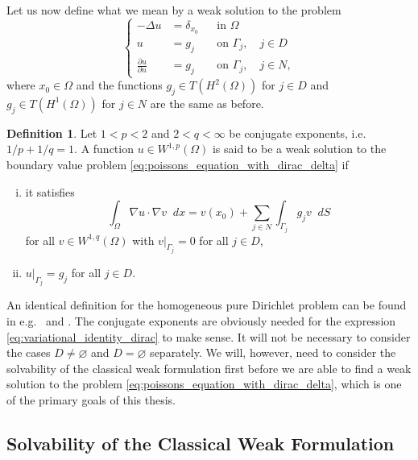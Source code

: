 \documentclass[english, 12pt, a4paper, sci, utf8, a-2b, online]{aaltothesis}
\theoremstyle{definition}
\newtheorem{definition}{Definition}[section]
\theoremstyle{plain}
\newcommand*\diff{\mathop{}\!d}
\numberwithin{equation}{section}
\begin{document}
Let us now define what we mean by a weak solution to the problem
\begin{equation}
    \label{eq:poissons_equation_with_dirac_delta}
    \left\{
        \begin{aligned}
            -\Delta u &= \delta_{x_0} && \text{in } \Omega \\
            u &= g_j && \text{on } \Gamma_j, \quad j \in D \\
            \frac{\partial u}{\partial n} &= g_j && \text{on } \Gamma_j,
            \quad j \in N,
        \end{aligned}
    \right.
\end{equation}
where $x_0 \in \Omega$ and the functions $g_j \in T(H^2(\Omega))$ for $j \in D$
and $g_j \in T(H^1(\Omega))$ for $j \in N$ are the same as before.
\begin{definition}
    \label{def:weak_solution_dirac}
    Let $1 < p < 2$ and $2 < q < \infty$ be conjugate exponents,
    i.e.\ $1/p + 1/q = 1$.
    A function $u \in W^{1,p}(\Omega)$ is said to be a weak solution to the
    boundary value problem \eqref{eq:poissons_equation_with_dirac_delta} if
    \begin{enumerate}[(i)]
        \item it satisfies
        \begin{equation}
            \label{eq:variational_identity_dirac}
            \int_{\Omega} \nabla u \cdot \nabla v \diff x
            = v(x_0) + \sum_{j \in N} \int_{\Gamma_j} g_j v \diff S
        \end{equation}
        for all $v \in W^{1,q}(\Omega)$ with $v|_{\Gamma_j} = 0$
        for all $j \in D$,
        \item $u|_{\Gamma_j} = g_j$ for all $j \in D$.
    \end{enumerate}
\end{definition}
An identical definition for the homogeneous pure Dirichlet problem
can be found in e.g.\ \cite{casas1985} and \cite{arayabehrens2006}.
The conjugate exponents are obviously needed for the expression
\eqref{eq:variational_identity_dirac} to make sense.
It will not be necessary to consider the cases $D \neq \varnothing$
and $D = \varnothing$ separately. We will, however, need to consider
the solvability of the classical weak formulation first before we are able
to find a weak solution to the problem 
\eqref{eq:poissons_equation_with_dirac_delta}, which is one of the
primary goals of this thesis.

\subsection{Solvability of the Classical Weak Formulation}
\label{subsec:solvability_of_the_classical_weak_formulation}
\end{document}

